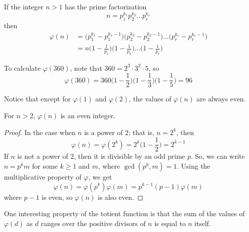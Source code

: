 \documentclass{article}
\newcounter{theorem}[section]
\newcounter{example}[section]
\begin{document}
\begin{theorem}
  \label{thm:totient-from-the-prime-factorization}
If the integer $n>1$ has the prime factorization
\begin{equation}
  n = p_1^{k_1} p_2^{k_2} ... p_r^{k_r}
\end{equation}
then
\begin{align*}
    \varphi(n) & = \big( p_1^{k_1} - p_1^{k_1 - 1} \big) \big( p_2^{k_2} - p_2^{k_2 - 1} \big) ... \big( p_r^{k_r} - p_r^{k_r - 1} \big) \\
    & = n \bigg(1 - \frac{1}{p_1} \bigg) \bigg(1 - \frac{1}{p_2} \bigg) ... \bigg( 1 - \frac{1}{p_r}\bigg) 
\end{align*}
\end{theorem}

\begin{example}
  \label{ex:computing-varphi360}
To calculate $\varphi(360)$, note that $360 = 2^3 \cdot 3^2 \cdot 5$, so 
\begin{equation}
  \varphi(360) = 360 \bigg(1 - \frac{1}{2} \bigg) \bigg( 1 - \frac{1}{3} \bigg) \bigg(1 - \frac{1}{5} \bigg) = 96
\end{equation}
\end{example}

Notice that except for $\varphi(1)$ and $\varphi(2)$, the values of $\varphi(n)$ are always even. 

\begin{theorem}
  \label{thm:totient-is-even-for-n2}
For $n>2$, $\varphi(n)$ is an even integer. 
\end{theorem}
\begin{proof}
In the case when $n$ is a power of $2$; that is, $n = 2^k$, then 
\begin{equation}
  \varphi(n) = \varphi(2^k) = 2^k \bigg(1 - \frac{1}{2} \bigg) = 2^{k-1}
\end{equation}
If $n$ is not a power of $2$, then it is divisible by an odd prime $p$. So, we can write $n = p^k m$ for some $k \geq 1$ and $m$, where $\gcd(p^k, m) = 1$. Using the multiplicative property of $\varphi$, we get 
\begin{equation}
  \varphi(n) = \varphi(p^k) \varphi(m) = p^{k-1} (p-1) \varphi(m)
\end{equation}
where $p-1$ is even, so $\varphi(n)$ is also even. 
\end{proof}

One interesting property of the totient function is that the sum of the values of $\varphi(d)$ as $d$ ranges over the positive divisors of $n$ is equal to $n$ itself. 
\end{document}
